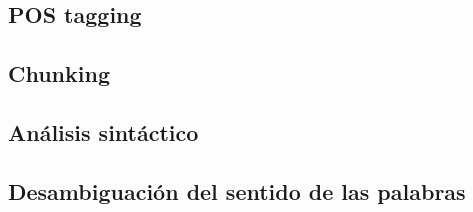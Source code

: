 \documentclass{ctexart}
\begin{document}
	\subsection{POS tagging}
	\begin{flushleft}
	\end{flushleft}
	\subsection{Chunking}
	\begin{flushleft}
	\end{flushleft}
	\subsection{Análisis sintáctico}
	\begin{flushleft}
	\end{flushleft}
	\subsection{Desambiguación del sentido de las palabras}
	\begin{flushleft}
	\end{flushleft}
\end{document}
